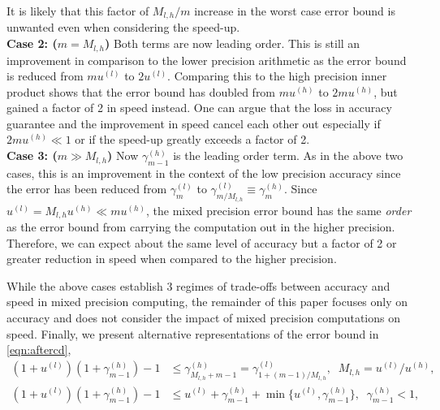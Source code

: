 \documentclass[review,onefignum,onetabnum]{siamart190516}
\begin{document}
It is likely that this factor of $M_{l,h}/m$ increase in the worst case error bound is unwanted even when considering the speed-up. 
\\
\textbf{Case 2: ($m = M_{l,h}$)}
Both terms are now leading order. 
This is still an improvement in comparison to the lower precision arithmetic as the error bound is reduced from $mu^{(l)}$ to $2u^{(l)}$.
Comparing this to the high precision inner product shows that the error bound has doubled from $mu^{(h)}$ to $2mu^{(h)}$, but gained a factor of 2 in speed instead. 
One can argue that the loss in accuracy guarantee and the improvement in speed cancel each other out especially if $2mu^{(h)}\ll 1$ or if the speed-up greatly exceeds a factor of 2. \\
\textbf{Case 3: ($m \gg M_{l,h}$)}
Now $\gamma_{m-1}^{(h)}$ is the leading order term. 
As in the above two cases, this is an improvement in the context of the low precision accuracy since the error has been reduced from $\gamma_m^{(l)}$ to $\gamma_{m/M_{l,h}}^{(l)}\equiv \gamma_m^{(h)}$. 
Since $u^{(l)} = M_{l,h}u^{(h)} \ll mu^{(h)}$, the mixed precision error bound has the same \emph{order} as the error bound from carrying the computation out in the higher precision. 
Therefore, we can expect about the same level of accuracy but a factor of 2 or greater reduction in speed when compared to the higher precision.\par
While the above cases establish 3 regimes of trade-offs between accuracy and speed in mixed precision computing, the remainder of this paper focuses only on accuracy and does not consider the impact of mixed precision computations on speed.
Finally, we present alternative representations of the error bound in \cref{eqn:aftercd},
\begin{align*}
(1+u^{(l)})(1+\gamma_{m-1}^{(h)})-1 &\leq \gamma_{M_{l,h}+m-1}^{(h)}=\gamma_{1+(m-1)/M_{l,h}}^{(l)}, \;\; M_{l,h} = u^{(l)}/u^{(h)},\\
(1+u^{(l)})(1+\gamma_{m-1}^{(h)})-1 &\leq  u^{(l)} + \gamma_{m-1}^{(h)} + \min\{u^{(l)}, \gamma_{m-1}^{(h)}\},\;\; \gamma_{m-1}^{(h)} < 1,
\end{align*}
\end{document}

